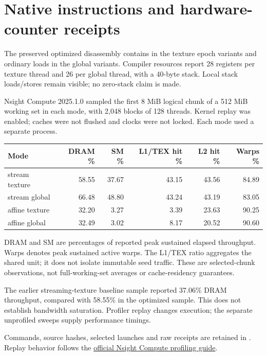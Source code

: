 \section{Native instructions and hardware-counter receipts}

The preserved optimized  disassembly contains  in the texture epoch variants and ordinary loads in the global variants. Compiler resources report 28 registers per texture thread and 26 per global thread, with a 40-byte stack. Local stack loads/stores remain visible; no zero-stack claim is made.

Nsight Compute 2025.1.0 sampled the first 8 MiB logical chunk of a 512 MiB working set in each mode, with 2,048 blocks of 128 threads. Kernel replay was enabled; caches were not flushed and clocks were not locked. Each mode used a separate process.

\begin{center}\small

\begin{tabular}{lrrrrr}

\toprule

Mode & DRAM \% & SM \% & L1/TEX hit \% & L2 hit \% & Warps \%\\\midrule

stream texture & 58.55 & 37.67 & 43.15 & 43.56 & 84.89\\

stream global & 66.48 & 48.80 & 43.24 & 43.19 & 83.05\\

affine texture & 32.20 & 3.27 & 3.39 & 23.63 & 90.25\\

affine global & 32.49 & 3.02 & 8.17 & 20.52 & 90.60\\

\bottomrule\end{tabular}\end{center}

DRAM and SM are percentages of reported peak sustained elapsed throughput. Warps denotes peak sustained active warps. The L1/TEX ratio aggregates the shared unit; it does not isolate immutable seed traffic. These are selected-chunk observations, not full-working-set averages or cache-residency guarantees.

The earlier streaming-texture baseline sample reported 37.06\% DRAM throughput, compared with 58.55\% in the optimized sample. This does not establish bandwidth saturation. Profiler replay changes execution; the separate unprofiled sweeps supply performance timings.

Commands, source hashes, selected launches and raw receipts are retained in . Replay behavior follows the \href{https://docs.nvidia.com/nsight-compute/ProfilingGuide/index.html#replay}{official Nsight Compute profiling guide}.
